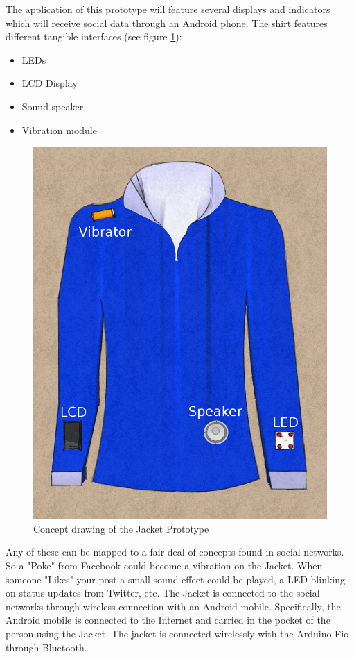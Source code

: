 The application of this prototype will feature several displays and indicators which will receive social data through an Android phone.
The shirt features different tangible interfaces (see figure \ref{fig:design-TShirt}):
	
\begin{itemize}
	\item LEDs
	\item LCD Display
	\item Sound speaker
	\item Vibration module
\end{itemize}

\begin{figure}[H]
	\begin{center}
	\includegraphics[scale=0.2]{img/design-tshirtproto}
	\end{center}
	\caption{Concept drawing of the Jacket Prototype}
	\label{fig:design-TShirt}
\end{figure}
	
Any of these can be mapped to a fair deal of concepts found in social networks.
So a "Poke" from Facebook could become a vibration on the Jacket. When someone "Likes" your post a small sound effect
could be played, a LED blinking on status updates from Twitter, etc. The Jacket is connected to the social networks
through wireless connection with an Android mobile. Specifically, the Android mobile is connected to the Internet
and carried in the pocket of the person using the Jacket. The jacket is connected wirelessly with the Arduino Fio through Bluetooth.

